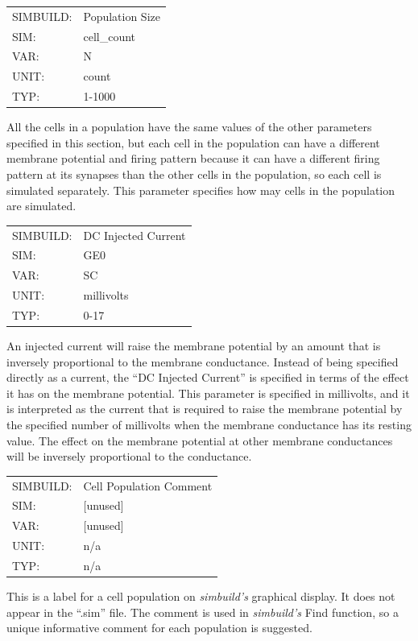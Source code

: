 \documentclass[12pt,openany,oneside]{book}
\newcommand{\prog}[1]{\textit{{#1}}}
\newcommand{\ext}[1]{{{``.#1''}}}
\newcommand{\inquotes}[1]{{{``#1''}}}
\begin{document}
\begin{flushleft}
\begin{tabular}{@{}ll@{}}
SIMBUILD: & Population Size\\
SIM: & cell\_count\\
VAR: & N\\
UNIT: & count\\
TYP: & 1-1000\\
\end{tabular}
\end{flushleft}
\noindent
All the cells in a population have the same values of the other parameters
specified in this section, but each cell in the population can have a
different membrane potential and firing pattern because it can
have a different firing pattern at its synapses than the other cells
in the population, so each cell is simulated separately. This
parameter specifies how may cells in the population are simulated.
\filbreak
\vspace{\baselineskip}

\begin{flushleft}
\begin{tabular}{@{}ll@{}}
SIMBUILD: & DC Injected Current\\
SIM: & GE0\\
VAR: & SC\\
UNIT: & millivolts\\
TYP: & 0-17\\
\end{tabular}
\end{flushleft}
\noindent
An injected current will raise the membrane potential by an amount
that is inversely proportional to the membrane conductance. Instead
of being specified directly as a current, the \inquotes{DC Injected
Current}
is specified in terms of the effect it has on the membrane potential.
This parameter is specified in millivolts, and it is interpreted as
the current that is required to raise the membrane potential by the
specified number of millivolts when the membrane conductance has its
resting value. The effect on the membrane potential at other membrane
conductances will be inversely proportional to the conductance.
\filbreak
\vspace{\baselineskip}

\begin{flushleft}
\begin{tabular}{@{}ll@{}}
SIMBUILD: & Cell Population Comment\\
SIM: & [unused]\\
VAR: & [unused]\\
UNIT: & n/a\\
TYP: & n/a\\
\end{tabular}
\end{flushleft}
\noindent
This is a label for a cell population on \prog{simbuild's} graphical
display. It does not appear in the \ext{sim} file. The comment is used in
\prog{simbuild's} Find function, so a unique informative comment for 
each population is suggested.
\end{document}
